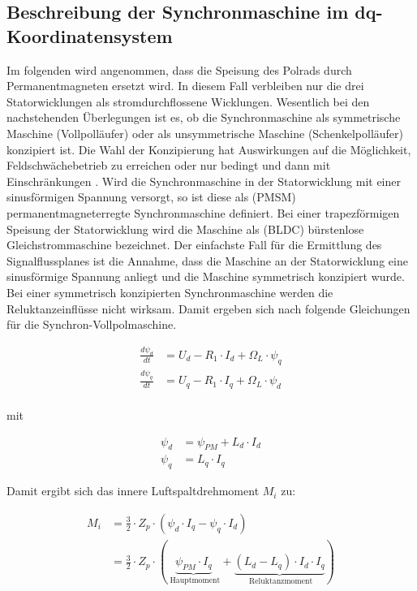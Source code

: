 \subsection{Beschreibung der Synchronmaschine im dq-Koordinatensystem}

Im folgenden wird angenommen, dass die Speisung des Polrads durch Permanentmagneten ersetzt wird.
In diesem Fall verbleiben nur die drei Statorwicklungen als stromdurchflossene Wicklungen.
Wesentlich bei den nachstehenden Überlegungen ist es, ob die Synchronmaschine als symmetrische Maschine (Vollpolläufer) oder als unsymmetrische Maschine (Schenkelpolläufer) konzipiert ist.
Die Wahl der Konzipierung hat Auswirkungen auf die Möglichkeit, Feldschwächebetrieb zu erreichen oder nur bedingt und dann mit Einschränkungen \autocite[S.~291]{schroder2000}.
Wird die Synchronmaschine in der Statorwicklung mit einer sinusförmigen Spannung versorgt, so ist diese als (PMSM) permanentmagneterregte Synchronmaschine definiert.
Bei einer trapezförmigen Speisung der Statorwicklung wird die Maschine als (BLDC) bürstenlose Gleichstrommaschine bezeichnet.
Der einfachste Fall für die Ermittlung des Signalflussplanes ist die Annahme, dass die Maschine an der Statorwicklung eine sinusförmige Spannung anliegt und die Maschine symmetrisch konzipiert wurde.
Bei einer symmetrisch konzipierten Synchronmaschine werden die Reluktanzeinflüsse nicht wirksam.
Damit ergeben sich nach \autocite[S.~291]{schroder2000} folgende Gleichungen für die Synchron-Vollpolmaschine.

\begin{align}
\frac{d\psi_d}{dt} &= U_d - R_1\cdot I_d + \Omega_L\cdot\psi_q \\
\frac{d\psi_q}{dt} &= U_q - R_1\cdot I_q + \Omega_L\cdot\psi_d \\
\end{align}

mit 

\begin{align}
\psi_d &= \psi_{PM} + L_d\cdot I_d\\
\psi_q &= L_q\cdot I_q
\end{align}

Damit ergibt sich das innere Luftspaltdrehmoment $M_i$ zu:

\begin{align}
M_i &= \frac{3}{2}\cdot Z_p \cdot (\psi_d\cdot I_q - \psi_q\cdot I_d) \\
\nonumber &= \frac{3}{2}\cdot Z_p \cdot (\underbrace{\psi_{PM}\cdot I_q}_{\text{~Hauptmoment}} + \underbrace{(L_d-L_q)\cdot I_d\cdot I_q}_{\text{~Reluktanzmoment}})
\end{align}

